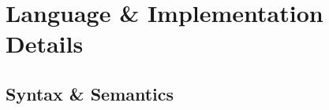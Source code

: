 \documentclass[mathserif,10pt]{beamer}
\begin{document}
\section{Language \& Implementation Details}
\subsection{Syntax \& Semantics}
\frame
{
  \begin{figure}[h]
  \centering
  \end{figure}
}
\frame
{
  \begin{figure}[h]
  \centering
  \end{figure}
}
\frame
{
  \begin{figure}[h]
  \centering
  \end{figure}
}
\end{document}
